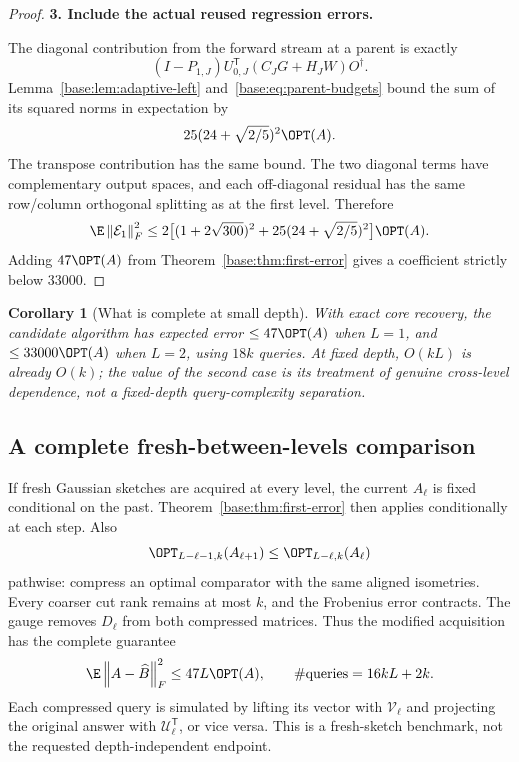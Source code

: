 \documentclass[11pt,oneside,openany,a4paper]{book}
\numberwithin{equation}{chapter}
\newtheorem{corollary}[theorem]{Corollary}
\theoremstyle{definition}
\theoremstyle{remark}
\newcommand{\proofstep}[1]{\par\addvspace{.45\baselineskip}\Needspace{3\baselineskip}\textbf{#1}\par\nobreak}
\newcommand{\T}{\mathsf T}\newcommand{\Id}{I}
\newcommand{\F}[1]{\left\lVert#1\right\rVert_F}
\newcommand{\UC}{\mathcal U}\newcommand{\VC}{\mathcal V}\newcommand{\err}{\mathcal E}
\begin{document}
\begin{proof}
\proofstep{3. Include the actual reused regression errors.}
The diagonal contribution from the forward stream at a parent is exactly
\[
 (I-P_{1,J})U_{0,J}^{\T}(C_JG+H_JW)O^\dagger.
\]
Lemma~\ref{base:lem:adaptive-left} and~\eqref{base:eq:parent-budgets} bound the sum of
its squared norms in expectation by
\begin{equation}\label{base:eq:second-regression}
 25(24+\sqrt{2/5})^2\OPT(A).
\end{equation}
The transpose contribution has the same bound. The two diagonal terms
have complementary output spaces, and each off-diagonal residual has the
same row/column orthogonal splitting as at the first level. Therefore
\begin{equation}\label{base:eq:second-total}
 \E\F{\err_1}^2
 \le2\bigl[(1+2\sqrt{300})^2
            +25(24+\sqrt{2/5})^2\bigr]\OPT(A).
\end{equation}
Adding $47\OPT(A)$ from Theorem~\ref{base:thm:first-error} gives a coefficient
strictly below $33000$.\end{proof}

\begin{corollary}[What is complete at small depth]
With exact core recovery, the candidate algorithm has expected error
$\le47\OPT(A)$ when $L=1$, and $\le33000\OPT(A)$ when $L=2$, using $18k$
queries. At fixed depth, $O(kL)$ is already $O(k)$; the value of the second
case is its treatment of genuine cross-level dependence, not a
fixed-depth query-complexity separation.
\end{corollary}

\subsection{A complete fresh-between-levels comparison}
If fresh Gaussian sketches are acquired at every level, the current
$A_\ell$ is fixed conditional on the past. Theorem~\ref{base:thm:first-error}
then applies conditionally at each step. Also
\begin{equation}\label{base:eq:opt-nonincreasing}
 \OPT_{L-\ell-1,k}(A_{\ell+1})
 \le\OPT_{L-\ell,k}(A_\ell)
\end{equation}
pathwise: compress an optimal comparator with the same aligned isometries.
Every coarser cut rank remains at most $k$, and the Frobenius error contracts.
The gauge removes $D_\ell$ from both compressed matrices.
Thus the modified acquisition has the complete guarantee
\begin{equation}\label{base:eq:fresh-endpoint}
 \E\F{A-\widehat B}^2\le47L\OPT(A),
 \qquad \#\text{queries}=16kL+2k.
\end{equation}
Each compressed query is simulated by lifting its vector with $\VC_\ell$
and projecting the original answer with $\UC_\ell^{\T}$, or vice versa.
This is a fresh-sketch benchmark, not the requested depth-independent
endpoint.
\end{document}
